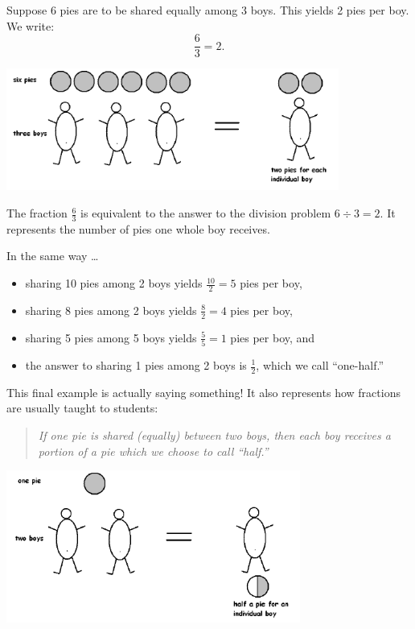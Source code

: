 \begin{example}
Suppose 6 pies are to be shared equally among 3 boys. This yields 2
pies per boy. We write:
\[
\frac 6 3 = 2.
\]


\begin{center}
\includegraphics[height = 4cm]{PPB1}
\end{center}

The fraction $\frac 6 3$ is equivalent to the answer to the division problem $6 \div 3 = 2$.  It represents the number of pies one whole boy receives. 
\end{example}

In the same way \dots

\begin{itemize}
\item[]
sharing 10 pies among 2 boys yields $ \frac{10}2 = 5 $ pies per boy,\\
\item[]
sharing 8 pies among 2 boys yields $ \frac{8}2 = 4 $ pies per boy,\\
\item[]
sharing 5 pies among 5 boys yields $ \frac{5}5 = 1 $ pies per boy, and\\


\item[]
the answer to sharing 1 pies among 2 boys is $ \frac{1}2 $, which we call ``one-half.''


\end{itemize}


This final example is actually saying something! It also represents how fractions are
usually taught to students:

\begin{quotation}
\emph{
If one pie is shared (equally) between two boys, then each boy receives a portion of
a pie which we choose to call ``half.''}
\end{quotation}

\begin{center}
\includegraphics[height = 5cm]{PPB2}
\end{center}




